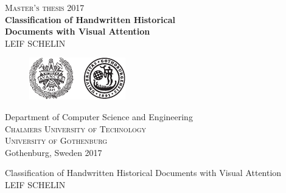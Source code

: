 \newpage
\thispagestyle{empty}
\begin{center}
	\textsc{\large Master's thesis 2017}\\[4cm]		%
	\textbf{\Large 
	Classification of Handwritten Historical  \\[0.2cm]
	Documents with Visual Attention
	} \\[1cm]
	{\large LEIF SCHELIN}
	
	\vfill	
	\begin{figure}[H]
	\centering
	\includegraphics[width=0.4\pdfpagewidth]{figures/auxiliary/logo_ch_gu.pdf}
	\end{figure}	\vspace{5mm}	
	
	Department of Computer Science and Engineering\\
	\textsc{Chalmers University of Technology} \\
	\textsc{University of Gothenburg} \\
	Gothenburg, Sweden 2017 \\
\end{center}


\newpage
\thispagestyle{plain}
\vspace*{4.5cm}
Classification of Handwritten Historical Documents with Visual Attention \\
LEIF SCHELIN \setlength{\parskip}{1cm}

